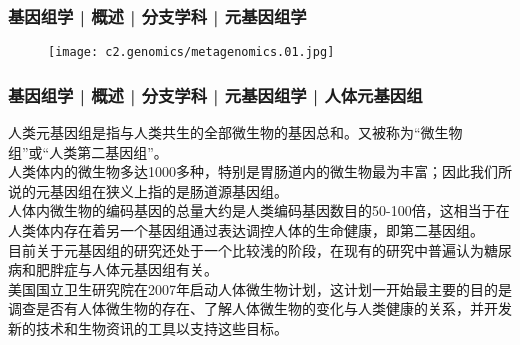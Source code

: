 \begin{frame}
  \frametitle{基因组学 | 概述 | 分支学科 | 元基因组学}
  \begin{figure}
    \centering
    \texttt{[image: c2.genomics/metagenomics.01.jpg]}
  \end{figure}
\end{frame}

\begin{frame}
  \frametitle{基因组学 | 概述 | 分支学科 | 元基因组学 | 人体元基因组}
人类元基因组是指与人类共生的全部微生物的基因总和。又被称为“微生物组”或“人类第二基因组”。\\
\vspace{1em}
人类体内的微生物多达1000多种，特别是胃肠道内的微生物最为丰富；因此我们所说的元基因组在狭义上指的是肠道源基因组。\\
\vspace{1em}
人体内微生物的编码基因的总量大约是人类编码基因数目的50-100倍，这相当于在人类体内存在着另一个基因组通过表达调控人体的生命健康，即第二基因组。\\
\vspace{1em}
目前关于元基因组的研究还处于一个比较浅的阶段，在现有的研究中普遍认为糖尿病和肥胖症与人体元基因组有关。\\
\vspace{1em}
美国国立卫生研究院在2007年启动人体微生物计划，这计划一开始最主要的目的是调查是否有人体微生物的存在、了解人体微生物的变化与人类健康的关系，并开发新的技术和生物资讯的工具以支持这些目标。
\end{frame}


